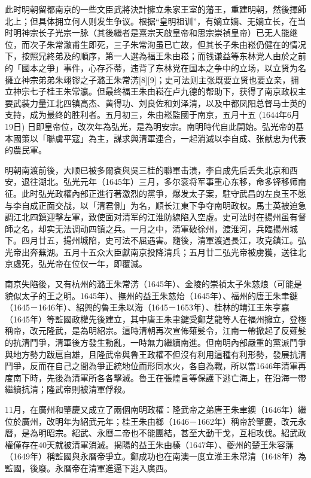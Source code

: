 此时明朝留都南京的一些文臣武將決計擁立朱家王室的藩王，重建明朝，然後揮師北上；但具体拥立何人则发生争议。根据“皇明祖训”，有嫡立嫡、无嫡立长，在当时明神宗长子光宗一脉（其後繼者是熹宗天啟皇帝和思宗崇禎皇帝）已无人能继位，而次子朱常漵甫生即死，三子朱常洵虽已亡故，但其长子朱由崧仍健在的情况下，按照兄終弟及的順序，第一人選為福王朱由崧；而钱谦益等东林党人由於之前的「國本之爭」事件，心存芥蒂，违背了东林党在国本之争中的立场，以立贤为名擁立神宗弟弟朱翊镠之子潞王朱常淓[8][9]；史可法则主张既要立贤也要立亲，拥立神宗七子桂王朱常瀛。但最终福王朱由崧在卢九德的帮助下，获得了南京政权主要武装力量江北四镇高杰、黄得功、刘良佐和刘泽清，以及中都凤阳总督马士英的支持，成为最终的胜利者。五月初三，朱由崧監國于南京，五月十五 (1644年6月19日) 日即皇帝位，改次年為弘光，是為明安宗。南明時代自此開始。弘光帝的基本國策以「聯虜平寇」為主，謀求與清軍連合，一起消滅以李自成、张献忠为代表的農民軍。

明朝南渡前後，大顺已被多爾袞與吳三桂的聯軍击溃，李自成先后丢失北京和西安，退往湖北。弘光元年（1645年）三月，多尔衮将军事重心东移，命多铎移师南征。此时弘光政權內部正進行著激烈的黨爭，爆发太子案，駐守武昌的左良玉不愿与李自成正面交战，以「清君側」为名，順长江東下争夺南明政权。馬士英被迫急調江北四鎮迎擊左軍，致使面对清军的江淮防線陷入空虛。史可法时在揚州虽有督師之名，却实无法调动四镇之兵。一月之中，清軍破徐州，渡淮河，兵臨揚州城下。四月廿五，揚州城陷，史可法不屈遇害。隨後，清軍渡過長江，攻克鎮江。弘光帝出奔蕪湖。五月十五众大臣獻南京投降清兵；五月廿二弘光帝被虜獲，送往北京處死，弘光帝在位仅一年，即覆滅。

南京失陷後，又有杭州的潞王朱常淓（1645年）、金陵的崇禎太子朱慈烺（可能是貌似太子的王之明。1645年）、撫州的益王朱慈炲（1645年）、福州的唐王朱聿鍵（1645－1646年）、紹興的魯王朱以海（1645－1653年）、桂林的靖江王朱亨嘉（1645年）等監國政權先後建立，其中唐王朱聿鍵受鄭芝龍等人在福州擁立，登極稱帝，改元隆武，是為明紹宗。這時清朝再次宣佈薙髮令，江南一帶掀起了反薙髮的抗清鬥爭，清軍後方發生動亂，一時無力繼續南進。但南明內部嚴重的黨派鬥爭與地方勢力跋扈自雄，且隆武帝與魯王政權不但沒有利用這種有利形勢，發展抗清鬥爭，反而在自己之間為爭正統地位而形同水火，各自為戰，所以當1646年清軍再度南下時，先後為清軍所各各擊滅。魯王在張煌言等保護下逃亡海上，在沿海一帶繼續抗清；隆武帝則被清軍俘殺。

11月，在廣州和肇慶又成立了兩個南明政權：隆武帝之弟唐王朱聿鐭（1646年）繼位於廣州，改明年为紹武元年；桂王朱由榔（1646－1662年）稱帝於肇慶，改元永曆，是為明昭宗。紹武、永曆二帝也不能團結，甚至大動干戈，互相攻伐。紹武政權僅存在40天就被清軍消滅。揭陽的益王朱由榛（1647年）、夔州的楚王朱容藩（1649年）稱監國與永曆帝爭立。鄭成功也在南澳一度立淮王朱常清（1648年）為監國，後廢。永曆帝在清軍進逼下逃入廣西。

